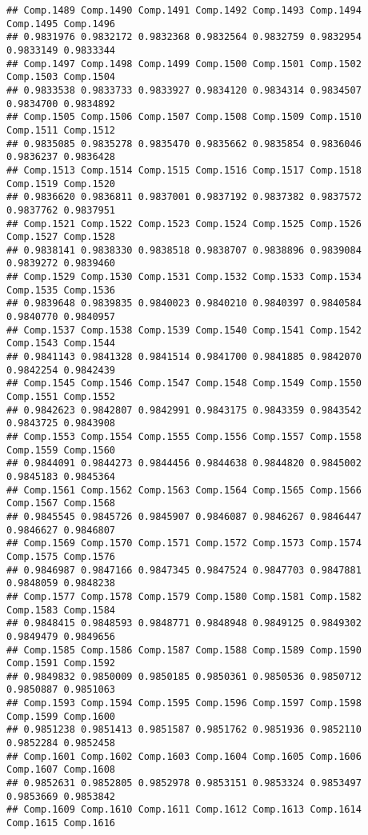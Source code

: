 \documentclass[
]{article}
\begin{document}
\begin{verbatim}
## Comp.1489 Comp.1490 Comp.1491 Comp.1492 Comp.1493 Comp.1494 Comp.1495 Comp.1496 
## 0.9831976 0.9832172 0.9832368 0.9832564 0.9832759 0.9832954 0.9833149 0.9833344 
## Comp.1497 Comp.1498 Comp.1499 Comp.1500 Comp.1501 Comp.1502 Comp.1503 Comp.1504 
## 0.9833538 0.9833733 0.9833927 0.9834120 0.9834314 0.9834507 0.9834700 0.9834892 
## Comp.1505 Comp.1506 Comp.1507 Comp.1508 Comp.1509 Comp.1510 Comp.1511 Comp.1512 
## 0.9835085 0.9835278 0.9835470 0.9835662 0.9835854 0.9836046 0.9836237 0.9836428 
## Comp.1513 Comp.1514 Comp.1515 Comp.1516 Comp.1517 Comp.1518 Comp.1519 Comp.1520 
## 0.9836620 0.9836811 0.9837001 0.9837192 0.9837382 0.9837572 0.9837762 0.9837951 
## Comp.1521 Comp.1522 Comp.1523 Comp.1524 Comp.1525 Comp.1526 Comp.1527 Comp.1528 
## 0.9838141 0.9838330 0.9838518 0.9838707 0.9838896 0.9839084 0.9839272 0.9839460 
## Comp.1529 Comp.1530 Comp.1531 Comp.1532 Comp.1533 Comp.1534 Comp.1535 Comp.1536 
## 0.9839648 0.9839835 0.9840023 0.9840210 0.9840397 0.9840584 0.9840770 0.9840957 
## Comp.1537 Comp.1538 Comp.1539 Comp.1540 Comp.1541 Comp.1542 Comp.1543 Comp.1544 
## 0.9841143 0.9841328 0.9841514 0.9841700 0.9841885 0.9842070 0.9842254 0.9842439 
## Comp.1545 Comp.1546 Comp.1547 Comp.1548 Comp.1549 Comp.1550 Comp.1551 Comp.1552 
## 0.9842623 0.9842807 0.9842991 0.9843175 0.9843359 0.9843542 0.9843725 0.9843908 
## Comp.1553 Comp.1554 Comp.1555 Comp.1556 Comp.1557 Comp.1558 Comp.1559 Comp.1560 
## 0.9844091 0.9844273 0.9844456 0.9844638 0.9844820 0.9845002 0.9845183 0.9845364 
## Comp.1561 Comp.1562 Comp.1563 Comp.1564 Comp.1565 Comp.1566 Comp.1567 Comp.1568 
## 0.9845545 0.9845726 0.9845907 0.9846087 0.9846267 0.9846447 0.9846627 0.9846807 
## Comp.1569 Comp.1570 Comp.1571 Comp.1572 Comp.1573 Comp.1574 Comp.1575 Comp.1576 
## 0.9846987 0.9847166 0.9847345 0.9847524 0.9847703 0.9847881 0.9848059 0.9848238 
## Comp.1577 Comp.1578 Comp.1579 Comp.1580 Comp.1581 Comp.1582 Comp.1583 Comp.1584 
## 0.9848415 0.9848593 0.9848771 0.9848948 0.9849125 0.9849302 0.9849479 0.9849656 
## Comp.1585 Comp.1586 Comp.1587 Comp.1588 Comp.1589 Comp.1590 Comp.1591 Comp.1592 
## 0.9849832 0.9850009 0.9850185 0.9850361 0.9850536 0.9850712 0.9850887 0.9851063 
## Comp.1593 Comp.1594 Comp.1595 Comp.1596 Comp.1597 Comp.1598 Comp.1599 Comp.1600 
## 0.9851238 0.9851413 0.9851587 0.9851762 0.9851936 0.9852110 0.9852284 0.9852458 
## Comp.1601 Comp.1602 Comp.1603 Comp.1604 Comp.1605 Comp.1606 Comp.1607 Comp.1608 
## 0.9852631 0.9852805 0.9852978 0.9853151 0.9853324 0.9853497 0.9853669 0.9853842 
## Comp.1609 Comp.1610 Comp.1611 Comp.1612 Comp.1613 Comp.1614 Comp.1615 Comp.1616 

\end{verbatim}
\end{document}
